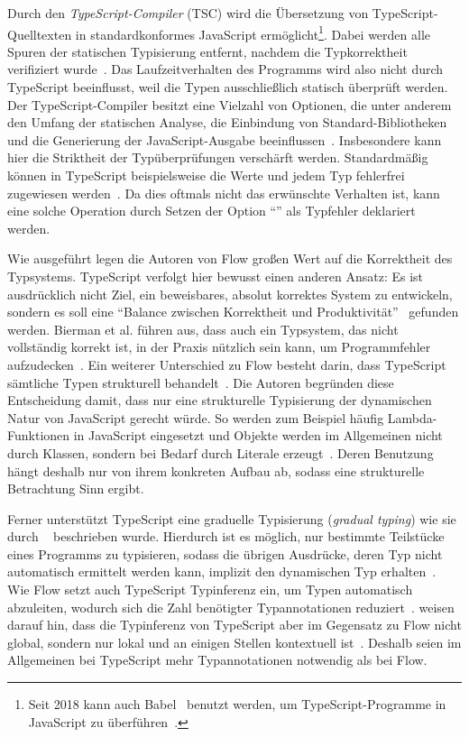 Durch den \textit{TypeScript-Compiler} (TSC) wird die Übersetzung von TypeScript-Quelltexten in standardkonformes JavaScript ermöglicht\footnote{Seit 2018 kann auch Babel~\autocite{BABEL} benutzt werden, um TypeScript-Programme in JavaScript zu überführen~\autocite{TYPESCRIPT:BABEL}.}. Dabei werden alle Spuren der statischen Typisierung entfernt, nachdem die Typkorrektheit verifiziert wurde~\autocite[3]{BIERMAN:2014}. Das Laufzeitverhalten des Programms wird also nicht durch TypeScript beeinflusst, weil die Typen ausschließlich statisch überprüft werden. Der TypeScript-Compiler besitzt eine Vielzahl von Optionen, die unter anderem den Umfang der statischen Analyse, die Einbindung von Standard-Bibliotheken und die Generierung der JavaScript-Ausgabe beeinflussen~\autocite{TSC:OPTIONS}. Insbesondere kann hier die Striktheit der Typüberprüfungen verschärft werden. Standardmäßig können in TypeScript beispielsweise die Werte  und  jedem Typ fehlerfrei zugewiesen werden~\autocite{TSC:OPTIONS}. Da dies oftmals nicht das erwünschte Verhalten ist, kann eine solche Operation durch Setzen der Option \enquote{} als Typfehler deklariert werden.

Wie ausgeführt legen die Autoren von Flow großen Wert auf die Korrektheit des Typsystems. TypeScript verfolgt hier bewusst einen anderen Ansatz: Es ist ausdrücklich nicht Ziel, ein beweisbares, absolut korrektes System zu entwickeln, sondern es soll eine \enquote{Balance zwischen Korrektheit und Produktivität}~\autocite{TYPESCRIPT:DESIGN_GOALS} gefunden werden. Bierman et al. führen aus, dass auch ein Typsystem, das nicht vollständig korrekt ist, in der Praxis nützlich sein kann, um Programmfehler aufzudecken~\autocite[3]{BIERMAN:2014}. Ein weiterer Unterschied zu Flow besteht darin, dass TypeScript sämtliche Typen strukturell behandelt~\autocite[38]{TYPESCRIPT:SPEC}.
Die Autoren begründen diese Entscheidung damit, dass nur eine strukturelle Typisierung der dynamischen Natur von JavaScript gerecht würde. So werden zum Beispiel häufig Lambda-Funktionen in JavaScript eingesetzt und Objekte werden im Allgemeinen nicht durch Klassen, sondern bei Bedarf durch Literale erzeugt~\autocite[3]{BIERMAN:2014}. Deren Benutzung hängt deshalb nur von ihrem konkreten Aufbau ab, sodass eine strukturelle Betrachtung Sinn ergibt.

Ferner unterstützt TypeScript eine graduelle Typisierung (\textit{gradual typing}) wie sie durch \citeauthor{SIEK:2007}~\autocite{SIEK:2007} beschrieben wurde. Hierdurch ist es möglich, nur bestimmte Teilstücke eines Programms zu typisieren, sodass die übrigen Ausdrücke, deren Typ nicht automatisch ermittelt werden kann, implizit den dynamischen Typ  erhalten~\autocite{TYPESCRIPT:DESIGN_GOALS}.
Wie Flow setzt auch TypeScript Typinferenz ein, um Typen automatisch abzuleiten, wodurch sich die Zahl benötigter Typannotationen reduziert~\autocite[4]{BIERMAN:2014}. \citeauthor{FLOW:PAPER} weisen darauf hin, dass die Typinferenz von TypeScript aber im Gegensatz zu Flow nicht global, sondern nur lokal und an einigen Stellen kontextuell ist~\autocite[24]{FLOW:PAPER}. Deshalb seien im Allgemeinen bei TypeScript mehr Typannotationen notwendig als bei Flow.

